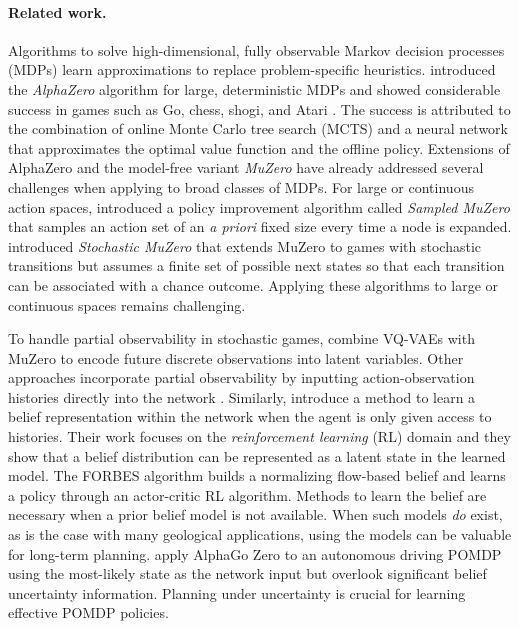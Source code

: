 \paragraph{Related work.}
Algorithms to solve high-dimensional, fully observable Markov decision processes (MDPs) learn approximations to replace problem-specific heuristics.
\citeauthor{silver2018general} introduced the \textit{AlphaZero} algorithm for large, deterministic MDPs and showed considerable success in games such as Go, chess, shogi, and Atari \cite{silver2018general, schrittwieser2020mastering}.
The success is attributed to the combination of online Monte Carlo tree search (MCTS) and a neural network that approximates the optimal value function and the offline policy.
Extensions of AlphaZero and the model-free variant \textit{MuZero} \cite{schrittwieser2020mastering} have already addressed several challenges when applying to broad classes of MDPs.
For large or continuous action spaces, \citeauthor{hubert2021learning} introduced a policy improvement algorithm called \textit{Sampled MuZero} that samples an action set of an \textit{a priori} fixed size every time a node is expanded.
\citeauthor{antonoglou2021planning} introduced \textit{Stochastic MuZero} that extends MuZero to games with stochastic transitions but assumes a finite set of possible next states so that each transition can be associated with a chance outcome.
Applying these algorithms to large or continuous spaces remains challenging.

To handle partial observability in stochastic games, \citeauthor{ozair2021vector} combine VQ-VAEs with MuZero to encode future discrete observations into latent variables.
Other approaches incorporate partial observability by inputting action-observation histories directly into the network \cite{kimura2020development, vinyals2019grandmaster}.
Similarly, \citeauthor{igl2018deep} introduce a method to learn a belief representation within the network when the agent is only given access to histories.
Their work focuses on the \textit{reinforcement learning} (RL) domain and they show that a belief distribution can be represented as a latent state in the learned model.
The FORBES algorithm \cite{chen2022flow} builds a normalizing flow-based belief and learns a policy through an actor-critic RL algorithm.
Methods to learn the belief are necessary when a prior belief model is not available.
When such models \textit{do} exist, as is the case with many geological applications, using the models can be valuable for long-term planning.
\citeauthor{hoel2019combining} apply AlphaGo Zero \cite{silver2017mastering} to an autonomous driving POMDP using the most-likely state as the network input but overlook significant belief uncertainty information.
Planning under uncertainty is crucial for learning effective POMDP policies.


